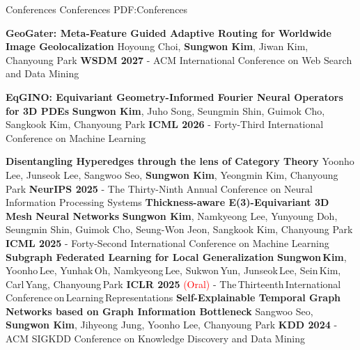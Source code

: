 \documentclass[letterpaper,MMMyyyy,nonstopmode]{simpleresumecv}
\begin{document}
\begin{Body}
\BigGap
\SubSection
{Conferences}
{Conferences}
{PDF:Conferences}

\begingroup
\renewcommand{\MaxNumberedItem}{[8888]}

\Gap
\NumberedItem{[C12]}
\textbf{GeoGater: Meta-Feature Guided Adaptive Routing for Worldwide Image Geolocalization}
\newline
Hoyoung Choi, \textbf{Sungwon Kim}, Jiwan Kim, Chanyoung Park
\newline
\textbf{WSDM 2027} - ACM International Conference on Web Search and Data Mining

\Gap
\NumberedItem{[C11]}
\textbf{EqGINO: Equivariant Geometry-Informed Fourier Neural Operators for 3D PDEs}
\newline
\textbf{Sungwon Kim}, Juho Song, Seungmin Shin, Guimok Cho, Sangkook Kim, Chanyoung Park
\newline
\textbf{ICML 2026} - Forty-Third International Conference on Machine Learning

\Gap
\NumberedItem{[C10]}
\textbf{Disentangling Hyperedges through the lens of Category Theory}
\newline
Yoonho Lee, Junseok Lee, Sangwoo Seo, \textbf{Sungwon Kim}, Yeongmin Kim, Chanyoung Park
\newline
\textbf{NeurIPS 2025} - The Thirty-Ninth Annual Conference on Neural Information Processing Systems
\Gap
\NumberedItem{[C9]}
\textbf{Thickness-aware E(3)-Equivariant 3D Mesh Neural Networks}
\newline
\textbf{Sungwon Kim}, Namkyeong Lee, Yunyoung Doh, Seungmin Shin, Guimok Cho, Seung-Won Jeon, Sangkook Kim, Chanyoung Park
\newline
\textbf{ICML 2025} - Forty-Second International Conference on Machine Learning
\Gap
\NumberedItem{[C8]}
\textbf{Subgraph Federated Learning for Local Generalization}
\newline
\textbf{Sungwon\,Kim}, Yoonho\,Lee, Yunhak\,Oh, Namkyeong\,Lee, Sukwon\,Yun, Junseok\,Lee, Sein\,Kim, Carl\,Yang, Chanyoung\,Park
\newline
\textbf{ICLR 2025} \textcolor{red}{(Oral)} - The\,Thirteenth\,International\,Conference\,on\,Learning\,Representations
\Gap
\NumberedItem{[C7]}
\textbf{Self-Explainable Temporal Graph Networks based on Graph Information Bottleneck}
\newline
Sangwoo Seo, \textbf{Sungwon Kim}, Jihyeong Jung, Yoonho Lee, Chanyoung Park
\newline
\textbf{KDD 2024} - ACM SIGKDD Conference on Knowledge Discovery and Data Mining


\end{Body}
\end{document}

